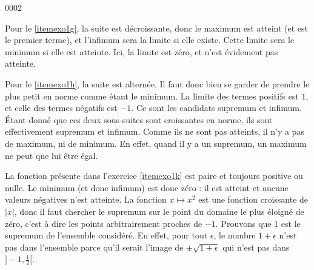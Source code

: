 
\begin{corrige}{0002}

Pour le \ref{itemexo1g}, la suite est décroissante, donc le maximum est atteint (et est le premier terme), et l'infimum sera la limite si elle existe. Cette limite sera le minimum si elle est atteinte. Ici, la limite est zéro, et n'est évidement pas atteinte.

Pour le \ref{itemexo1h}, la suite est alternée. Il faut donc bien se garder de prendre le plus petit en norme comme étant le minimum. La limite des termes positifs est $1$, et celle des termes négatifs est $-1$. Ce sont les candidats supremum et infimum. Étant donné que ces deux sous-suites sont croissantes en norme, ils sont effectivement supremum et infimum. Comme ils ne sont pas atteints, il n'y a pas de maximum, ni de minimum. En effet, quand il y a un supremum, un maximum ne peut que lui être égal.

La fonction présente dans l'exercice \ref{itemexo1k} est paire et toujours positive ou nulle. Le minimum (et donc infimum) est donc zéro : il est atteint et aucune valeurs négatives n'est atteinte. La fonction $x\mapsto x^2$ est une fonction croissante de $| x |$, donc il faut chercher le supremum sur le point du domaine le plus éloigné de zéro, c'est à dire les points arbitrairement proches de $-1$. Prouvons que $1$ est le supremum de l'ensemble considéré. En effet, pour tout $\epsilon$, le nombre $1+\epsilon$ n'est pas dans l'ensemble parce qu'il serait l'image de $\pm\sqrt{1+\epsilon}$ qui n'est pas dans $]-1,\frac{1}{ 2 }[$.

\end{corrige}

